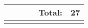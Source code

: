 \begin{landscape}
\begin{tabularx}{\linewidth}{p{0.13\linewidth} p{0.13\linewidth} p{0.13\linewidth} p{0.13\linewidth} p{0.13\linewidth} p{0.13\linewidth} r}
        \multicolumn{6}{r}{Total:} & 27 \\ \bottomrule
        \endlastfoot
        
    \end{tabularx}
    \egroup
\end{landscape}